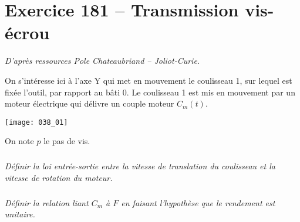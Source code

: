 \section*{Exercice 181 -- Transmission vis-écrou}
\setcounter{exo}{0}

\textit{D'après ressources Pole Chateaubriand -- Joliot-Curie.}

On s’intéresse ici à l’axe Y qui met en mouvement le coulisseau 1,
sur lequel est fixée l’outil, par rapport au bâti 0. Le coulisseau 1 est mis en mouvement par un moteur
électrique qui délivre un couple moteur $C_m(t)$.

\begin{center}
\texttt{[image: 038\_01]}
\end{center}

On note $p$ le pas de vis. 


\subparagraph{}
\textit{Définir la loi entrée-sortie entre la vitesse de translation du coulisseau et la vitesse de rotation du moteur. }
\ifprof
\begin{corrige}
\end{corrige}
\else
\fi

\subparagraph{}
\textit{Définir la relation liant $C_m$ à $F$ en faisant l'hypothèse que le rendement est unitaire. }
\ifprof
\begin{corrige}
\end{corrige}
\else
\fi